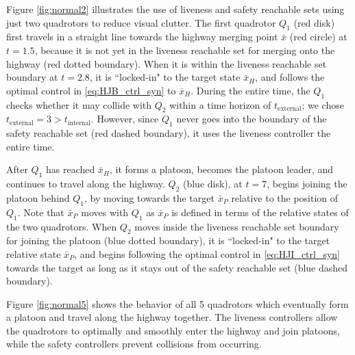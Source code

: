 Figure \ref{fig:normal2} illustrates the use of liveness and safety reachable sets using just two quadrotors to reduce visual clutter. The first quadrotor $Q_1$ (red disk) first travels in a straight line towards the highway merging point $\bar{x}$ (red circle) at $t=1.5$, because it is not yet in the liveness reachable set for merging onto the highway (red dotted boundary). When it is within the liveness reachable set boundary at $t=2.8$, it is ``locked-in" to the target state $\bar{x}_H$, and follows the optimal control in \eqref{eq:HJB_ctrl_syn} to $\bar{x}_H$. During the entire time, the $Q_1$ checks whether it may collide with $Q_2$ within a time horizon of $t_\text{external}$; we chose $t_\text{external}=3>t_\text{internal}$. However, since $Q_1$ never goes into the boundary of the safety reachable set (red dashed boundary), it uses the liveness controller the entire time.

After $Q_1$ has reached $\bar{x}_H$, it forms a platoon, becomes the platoon leader, and continues to travel along the highway. $Q_2$ (blue disk), at $t=7$, begins joining the platoon behind $Q_1$, by moving towards the target $\bar{x}_P$ relative to the position of $Q_1$. Note that $\bar{x}_P$ moves with $Q_1$ as $\bar{x}_P$ is defined in terms of the relative states of the two quadrotors. When $Q_2$ moves inside the liveness reachable set boundary for joining the platoon (blue dotted boundary), it is ``locked-in" to the target relative state $\bar{x}_P$, and begins following the optimal control in \eqref{eq:HJI_ctrl_syn} towards the target as long as it stays out of the safety reachable set (blue dashed boundary).

Figure \ref{fig:normal5} shows the behavior of all 5 quadrotors which eventually form a platoon and travel along the highway together. The liveness controllers allow the quadrotors to optimally and smoothly enter the highway and join platoons, while the safety controllers prevent collisions from occurring.

